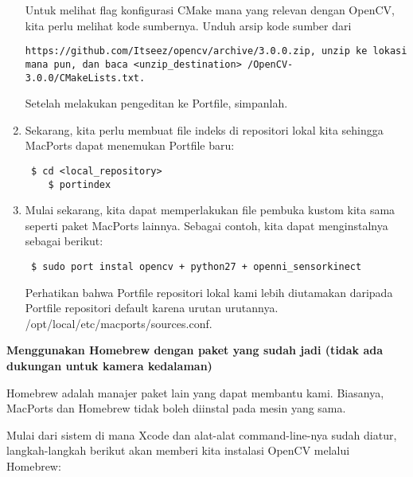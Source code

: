 \begin{enumerate}
	Untuk melihat flag konfigurasi CMake mana yang relevan dengan OpenCV, kita perlu melihat kode sumbernya. Unduh arsip kode sumber dari
	\begin{verbatim}https://github.com/Itseez/opencv/archive/3.0.0.zip, unzip ke lokasi mana pun, dan baca <unzip_destination> /OpenCV-3.0.0/CMakeLists.txt.\end{verbatim}
	Setelah melakukan pengeditan ke Portfile, simpanlah.
	\item Sekarang, kita perlu membuat file indeks di repositori lokal kita sehingga MacPorts dapat menemukan Portfile baru:
	\begin{verbatim} $ cd <local_repository>
	$ portindex \end{verbatim}
	\item Mulai sekarang, kita dapat memperlakukan file pembuka kustom kita sama seperti paket MacPorts lainnya. Sebagai contoh, kita dapat menginstalnya sebagai berikut:
	\begin{verbatim} $ sudo port instal opencv + python27 + openni_sensorkinect \end{verbatim}
	Perhatikan bahwa Portfile repositori lokal kami lebih diutamakan daripada Portfile repositori default karena urutan urutannya.
	/opt/local/etc/macports/sources.conf.
\end{enumerate}

\newpage
\textbf{Menggunakan Homebrew dengan paket yang sudah jadi (tidak ada dukungan untuk kamera kedalaman)}

Homebrew adalah manajer paket lain yang dapat membantu kami. Biasanya, MacPorts dan Homebrew tidak boleh diinstal pada mesin yang sama. 

Mulai dari sistem di mana Xcode dan alat-alat command-line-nya sudah diatur, langkah-langkah berikut akan memberi kita instalasi OpenCV melalui Homebrew:

